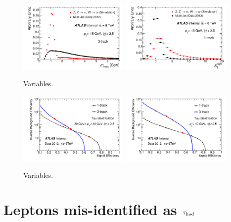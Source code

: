\begin{figure}[tp]
  \centering
  \includegraphics[width=0.48\textwidth]{figures/PERF-2013-06_tmp/massTrkSys_3p}
  \includegraphics[width=0.48\textwidth]{figures/PERF-2013-06_tmp/trFlightPathSig_3p}
  \caption{Variables.}
  \label{fig:taus-id3p}
\end{figure}

\begin{figure}[tp]
  \centering
  \includegraphics[width=0.48\textwidth]{figures/PERF-2013-06_tmp/roc_lowpt}
  \includegraphics[width=0.48\textwidth]{figures/PERF-2013-06_tmp/roc_highpt}
  \caption{Variables.}
  \label{fig:taus-idroc}
\end{figure}

\section{Leptons mis-identified as $\tau_\text{had}$}
\label{sec:taus-leptonfakes}

